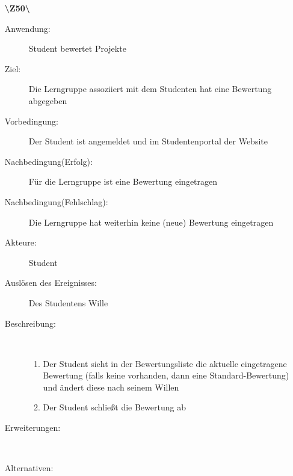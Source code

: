 \documentclass[a4paper]{article}
\begin{document}
\begin{enumerate}
  \item[\textbf{\textbackslash Z50\textbackslash}] \begin{description}
  \item[Anwendung:] Student bewertet Projekte
  \item[Ziel:] Die Lerngruppe assoziiert mit dem Studenten hat eine Bewertung abgegeben
  	\item[Vorbedingung:] Der Student ist angemeldet und im Studentenportal der Website
  	\item[Nachbedingung(Erfolg):] Für die Lerngruppe ist eine Bewertung eingetragen
  	\item[Nachbedingung(Fehlschlag):] Die Lerngruppe hat weiterhin keine (neue) Bewertung eingetragen
  	\item[Akteure:] Student
  	\item[Auslösen des Ereignisses:] Des Studentens Wille
  	\item[Beschreibung:]~
  	 \begin{enumerate}[1.]
  	   \item Der Student sieht in der Bewertungsliste die aktuelle eingetragene Bewertung (falls keine vorhanden, dann eine Standard-Bewertung) und ändert diese nach seinem Willen
  	   \item Der Student schließt die Bewertung ab
  	 \end{enumerate}
  	\item[Erweiterungen:]~
  	\item[Alternativen:] ~
  \end{description}
\end{enumerate}
\end{document}
